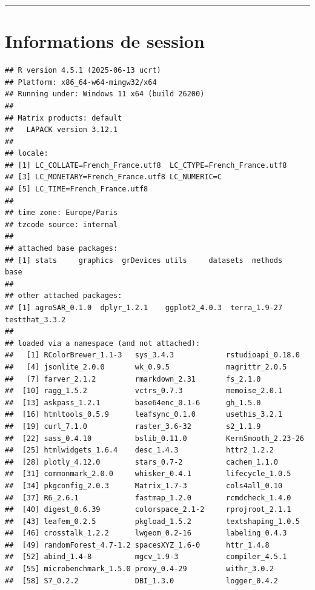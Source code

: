 \documentclass[
]{article}
\begin{document}
\begin{center}\rule{0.5\linewidth}{0.5pt}\end{center}

\section{Informations de session}\label{informations-de-session}

\begin{verbatim}
## R version 4.5.1 (2025-06-13 ucrt)
## Platform: x86_64-w64-mingw32/x64
## Running under: Windows 11 x64 (build 26200)
## 
## Matrix products: default
##   LAPACK version 3.12.1
## 
## locale:
## [1] LC_COLLATE=French_France.utf8  LC_CTYPE=French_France.utf8   
## [3] LC_MONETARY=French_France.utf8 LC_NUMERIC=C                  
## [5] LC_TIME=French_France.utf8    
## 
## time zone: Europe/Paris
## tzcode source: internal
## 
## attached base packages:
## [1] stats     graphics  grDevices utils     datasets  methods   base     
## 
## other attached packages:
## [1] agroSAR_0.1.0  dplyr_1.2.1    ggplot2_4.0.3  terra_1.9-27   testthat_3.3.2
## 
## loaded via a namespace (and not attached):
##   [1] RColorBrewer_1.1-3   sys_3.4.3            rstudioapi_0.18.0   
##   [4] jsonlite_2.0.0       wk_0.9.5             magrittr_2.0.5      
##   [7] farver_2.1.2         rmarkdown_2.31       fs_2.1.0            
##  [10] ragg_1.5.2           vctrs_0.7.3          memoise_2.0.1       
##  [13] askpass_1.2.1        base64enc_0.1-6      gh_1.5.0            
##  [16] htmltools_0.5.9      leafsync_0.1.0       usethis_3.2.1       
##  [19] curl_7.1.0           raster_3.6-32        s2_1.1.9            
##  [22] sass_0.4.10          bslib_0.11.0         KernSmooth_2.23-26  
##  [25] htmlwidgets_1.6.4    desc_1.4.3           httr2_1.2.2         
##  [28] plotly_4.12.0        stars_0.7-2          cachem_1.1.0        
##  [31] commonmark_2.0.0     whisker_0.4.1        lifecycle_1.0.5     
##  [34] pkgconfig_2.0.3      Matrix_1.7-3         cols4all_0.10       
##  [37] R6_2.6.1             fastmap_1.2.0        rcmdcheck_1.4.0     
##  [40] digest_0.6.39        colorspace_2.1-2     rprojroot_2.1.1     
##  [43] leafem_0.2.5         pkgload_1.5.2        textshaping_1.0.5   
##  [46] crosstalk_1.2.2      lwgeom_0.2-16        labeling_0.4.3      
##  [49] randomForest_4.7-1.2 spacesXYZ_1.6-0      httr_1.4.8          
##  [52] abind_1.4-8          mgcv_1.9-3           compiler_4.5.1      
##  [55] microbenchmark_1.5.0 proxy_0.4-29         withr_3.0.2         
##  [58] S7_0.2.2             DBI_1.3.0            logger_0.4.2        

\end{verbatim}
\end{document}
